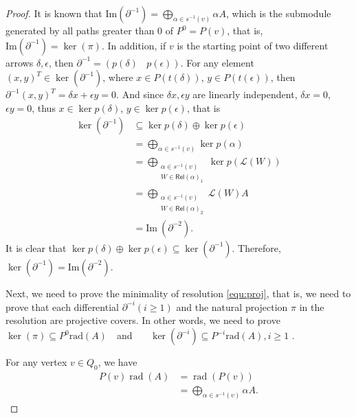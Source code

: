 \documentclass[11pt]{amsart}
\numberwithin{equation}{section}
\theoremstyle{definition}
\begin{document}
\begin{proof}
	It is known that \( \text{Im}(\partial^{-1}) = \bigoplus\limits_{\alpha \in s^{-1}(v)} \alpha A \), which is the submodule generated by all paths greater than 0 of \( P^0 = P(v) \), that is, \( \text{Im}(\partial^{-1}) = \ker(\pi) \). In addition, if \( v \) is the starting point of two different arrows \( \delta, \epsilon \), then \( \partial^{-1} = (p(\delta)~~~~p(\epsilon)) \). 
	For any element \( (x, y)^T \in \ker(\partial^{-1}) \), where \( x \in P(t(\delta)) \), \( y \in P(t(\epsilon)) \), then \( \partial^{-1}(x, y)^T = \delta x + \epsilon y = 0 \). And since \( \delta x, \epsilon y \) are linearly independent, \( \delta x = 0 \), \( \epsilon y = 0 \), thus \( x \in \ker p(\delta) \), \( y \in \ker p(\epsilon) \), that is
	\[
	\begin{aligned}
		\ker(\partial^{-1})  &\subseteq \ker p(\delta) \oplus \ker p(\epsilon) \\
		&= \bigoplus\limits_{\alpha \in s^{-1}(v)} \ker p(\alpha) \\
		&= \bigoplus\limits_{\substack{\alpha \in s^{-1}(v) \\ W \in \mathsf{Rel}(\alpha)_1}} \ker p(\mathscr{L}(W)) \\
		&= \bigoplus\limits_{\substack{\alpha \in s^{-1}(v) \\ W \in \mathsf{Rel}(\alpha)_2}} \mathscr{L}(W)A \\
		&= \text{Im}~(\partial^{-2}).
	\end{aligned}
	\]
	It is clear that \( \ker p(\delta) \oplus \ker p(\epsilon) \subseteq \ker(\partial^{-1}) \).
    Therefore, \( \ker(\partial^{-1}) = \text{Im}(\partial^{-2}) \).
	
	Next, we need to prove the minimality of resolution \ref{equ:proj}, that is, we need to prove that each differential \( \partial^{-i} (i \geq 1) \) and the natural projection \( \pi \) in the resolution are projective covers. 
	In other words, we need to prove 
    \( \ker(\pi) \subseteq P^0 \text{rad}(A) \)~~and~~~ \( \ker(\partial^{-i}) \subseteq P^{-i} \text{rad}(A) , i \geq 1 \) . 

	For any vertex \( v \in Q_0 \), we have 
	\begin{align*}
		P(v)\operatorname{rad}(A) &= \operatorname{rad}(P(v)) \\
		&= \bigoplus_{\alpha \in s^{-1}(v)} \alpha A .
	\end{align*}
	

\end{proof}
\end{document}
